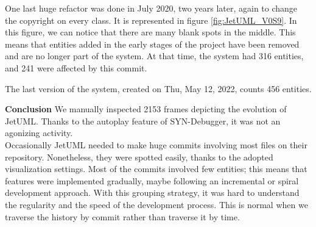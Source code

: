 One last huge refactor was done in July 2020, two years later, again to change the copyright on every class. It is represented in figure \ref{fig:JetUML_V0S9}. In this figure, we can notice that there are many blank spots in the middle. This means that entities added in the early stages of the project have been removed and are no longer part of the system. At that time, the system had 316 entities, and 241 were affected by this commit. 

The last version of the system, created on Thu, May 12, 2022, counts 456 entities. 

\textbf{Conclusion}
We manually inspected 2153 frames depicting the evolution of JetUML.
Thanks to the autoplay feature of SYN-Debugger, it was not an agonizing activity. \\
Occasionally JetUML needed to make huge commits involving most files on their repository. Nonetheless, they were spotted easily, thanks to the adopted visualization settings. 
Most of the commits involved few entities; this means that features were implemented gradually, maybe following an incremental or spiral development approach. 
With this grouping strategy, it was hard to understand the regularity and the speed of the development process. This is normal when we traverse the history by commit rather than traverse it by time. 

